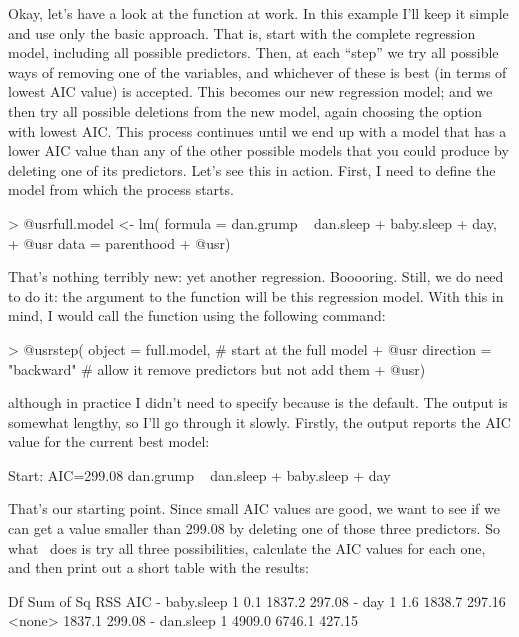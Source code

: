 Okay, let's have a look at the  function at work. In this example I'll keep it simple and use only the basic  approach. That is, start with the complete regression model, including all possible predictors. Then, at each ``step'' we try all possible ways of removing one of the variables, and whichever of these is best (in terms of lowest AIC value) is accepted. This becomes our new regression model; and we then try all possible deletions from the new model, again choosing the option with lowest AIC. This process continues until we end up with a model that has a lower AIC value than any of the other possible models that you could produce by deleting one of its predictors. Let's see this in action. First, I need to define the model from which the process starts. 
\begin{rblock1}
> @usr{full.model <- lm( formula = dan.grump ~ dan.sleep + baby.sleep + day,}  
+ @usr{                  data = parenthood}  
+ @usr{)}
\end{rblock1}
That's nothing terribly new: yet another regression. Booooring. Still, we do need to do it: the  argument to the  function will be this regression model. With this in mind, I would call the  function using the following command:
\begin{rblock1}
> @usr{step( object = full.model, }    # start at the full model
+ @usr{      direction = "backward"}   # allow it remove predictors but not add them
+ @usr{)}
\end{rblock1}
although in practice I didn't need to specify  because  is the default. The output is somewhat lengthy, so I'll go through it slowly. Firstly, the output reports the AIC value for the current best model:
\begin{rblock1}
Start:  AIC=299.08
dan.grump ~ dan.sleep + baby.sleep + day
\end{rblock1}
That's our starting point. Since small AIC values are good, we want to see if we can get a value smaller than 299.08 by deleting one of those three predictors. So what \R\ does is try all three possibilities, calculate the AIC values for each one, and then print out a short table with the results:
\begin{rblock1}
             Df Sum of Sq    RSS    AIC
- baby.sleep  1       0.1 1837.2 297.08
- day         1       1.6 1838.7 297.16
<none>                    1837.1 299.08
- dan.sleep   1    4909.0 6746.1 427.15
\end{rblock1}
